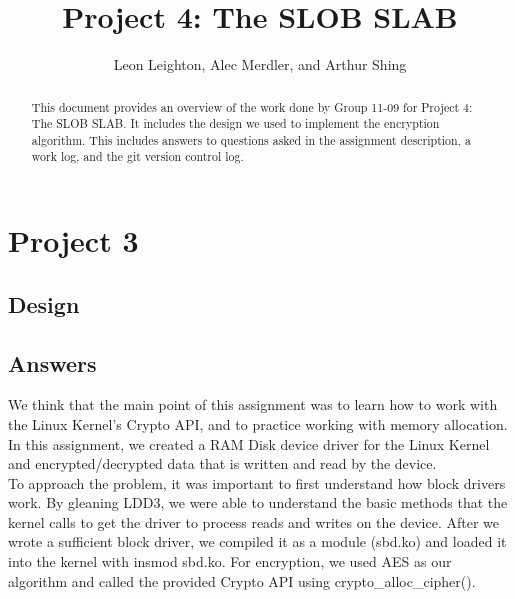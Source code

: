 \documentclass[journal, letterpaper, draftclsnofoot, onecolumn, 10pt]{IEEEtran}
\begin{document}
\title{Project 4: The SLOB SLAB}
\author{Leon Leighton, Alec Merdler, and Arthur Shing}

\begin{titlepage}
    \centering
    \maketitle
    \begin{abstract}
      This document provides an overview of the work done by Group 11-09 for Project 4: The SLOB SLAB.
      It includes the design we used to implement the encryption algorithm.
      This includes answers to questions asked in the assignment description, a work log, and the git version control log.
    \end{abstract}


\end{titlepage}
\tableofcontents
\clearpage

\section{Project 3}

\subsection{Design}


\subsection{Answers}


We think that the main point of this assignment was to learn how to work with the Linux Kernel's Crypto API, and to practice working with memory allocation.
In this assignment, we created a RAM Disk device driver for the Linux Kernel and encrypted/decrypted data that is written and read by the device. \\

To approach the problem, it was important to first understand how block drivers work.
By gleaning LDD3, we were able to understand the basic methods that the kernel calls to get the driver to process reads and writes on the device.
After we wrote a sufficient block driver, we compiled it as a module (sbd.ko) and loaded it into the kernel with insmod sbd.ko.
For encryption, we used AES as our algorithm and called the provided Crypto API using crypto\_alloc\_cipher(). \\
\end{document}
